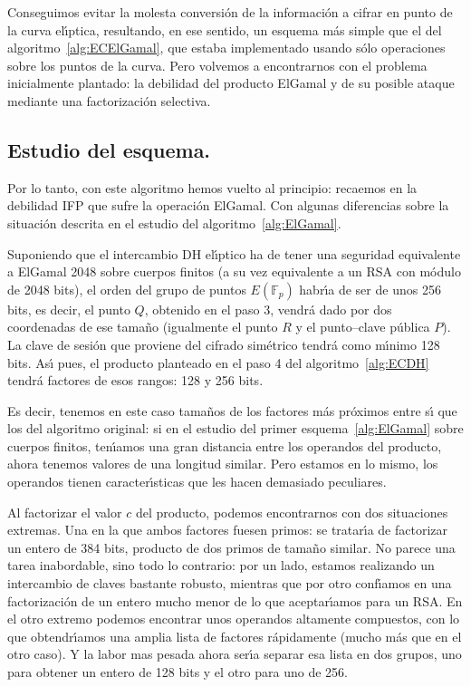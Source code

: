 \documentclass{llncs}
\def\ce{curva{} el\'{\i}ptica}%
\newcommand{\Fp}{\ensuremath{\mathbb{F}_p}}%
\theoremstyle{plain}        			%
\theoremstyle{definition}   			%
\theoremstyle{saltolinea}   			%
\begin{document}
Conseguimos evitar la molesta conversi\'on de la informaci\'on a cifrar en punto de la \ce{}, resultando, en ese sentido, un esquema m\'as simple que el del algoritmo~\ref{alg:ECElGamal}, que estaba implementado usando s\'olo operaciones sobre los puntos de la curva. Pero volvemos a encontrarnos con el problema inicialmente plantado: la debilidad del producto ElGamal y de su posible ataque mediante una factorizaci\'on selectiva.

\subsection*{Estudio del esquema.}

Por lo tanto, con este algoritmo hemos vuelto al principio: recaemos en la debilidad IFP que sufre la operaci\'on ElGamal. Con algunas diferencias sobre la situaci\'on descrita en el estudio del algoritmo~\ref{alg:ElGamal}. 

Suponiendo que el intercambio DH el\'{\i}ptico ha de tener una seguridad equivalente a ElGamal 2048 sobre cuerpos finitos (a su vez equivalente a un RSA con m\'odulo de 2048 bits), el orden del grupo de puntos $E(\Fp)$ habr\'{\i}a de ser de unos 256 bits, es decir, el punto $Q$, obtenido en el paso 3, vendr\'a dado por dos coordenadas de ese tama\~no (igualmente el punto $R$ y el punto--clave p\'ublica $P$). La clave de sesi\'on que proviene del cifrado sim\'etrico tendr\'a como m\'{\i}nimo 128 bits. As\'{\i} pues, el producto planteado en el paso 4 del algoritmo~\ref{alg:ECDH} tendr\'a factores de esos rangos: 128 y 256 bits.

Es decir, tenemos en este caso tama\~nos de los factores m\'as pr\'oximos entre s\'{\i} que los del algoritmo original: si en el estudio del primer esquema~\ref{alg:ElGamal} sobre cuerpos finitos, ten\'{\i}amos una gran distancia entre los operandos del producto, ahora tenemos valores de una longitud similar. Pero estamos en lo mismo, los operandos tienen caracter\'{\i}sticas que les hacen demasiado peculiares.

Al factorizar el valor $c$ del producto, podemos encontrarnos con dos situaciones extremas. Una en la que ambos factores fuesen primos: se tratar\'{\i}a de factorizar un entero de 384 bits, producto de dos primos de tama\~no similar. No parece una tarea inabordable, sino todo lo contrario: por un lado, estamos realizando un intercambio de claves bastante robusto, mientras que por otro conf\'{\i}amos en una factorizaci\'on de un entero mucho menor de lo que aceptar\'{\i}amos para un RSA. En el otro extremo podemos encontrar unos operandos altamente compuestos, con lo que obtendr\'{\i}amos una amplia lista de factores r\'apidamente (mucho m\'as que en el otro caso). Y la labor mas pesada ahora ser\'{\i}a separar esa lista en dos grupos, uno para obtener un entero de 128 bits y el otro para uno de 256.
\end{document}
